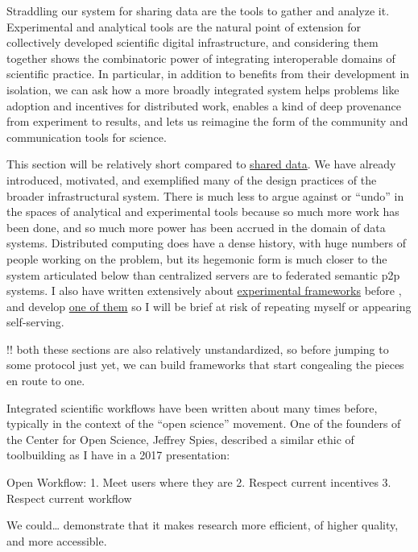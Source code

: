 \documentclass[10pt]{article}
\begin{document}
\begin{multicols}{2}
 Straddling our system for sharing data are the tools to
gather and analyze it. Experimental and analytical tools are the natural
point of extension for collectively developed scientific digital
infrastructure, and considering them together shows the combinatoric
power of integrating interoperable domains of scientific practice. In
particular, in addition to benefits from their development in isolation,
we can ask how a more broadly integrated system helps problems like
adoption and incentives for distributed work, enables a kind of deep
provenance from experiment to results, and lets us reimagine the form of
the community and communication tools for science.

This section will be relatively short compared to
\protect\hyperlink{shared-data}{shared data}. We have already
introduced, motivated, and exemplified many of the design practices of
the broader infrastructural system. There is much less to argue against
or ``undo'' in the spaces of analytical and experimental tools because
so much more work has been done, and so much more power has been accrued
in the domain of data systems. Distributed computing does have a dense
history, with huge numbers of people working on the problem, but its
hegemonic form is much closer to the system articulated below than
centralized servers are to federated semantic p2p systems. I also have
written extensively about
\protect\hyperlink{experimental-frameworks}{experimental frameworks}
before \cite{saundersAutopilotAutomatingBehavioral2019} , and
develop \href{https://docs.auto-pi-lot.com/en/latest/}{one of them} so I
will be brief at risk of repeating myself or appearing self-serving.

!! both these sections are also relatively unstandardized, so before
jumping to some protocol just yet, we can build frameworks that start
congealing the pieces en route to one.

Integrated scientific workflows have been written about many times
before, typically in the context of the ``open science'' movement. One
of the founders of the Center for Open Science, Jeffrey Spies, described
a similar ethic of toolbuilding as I have in a 2017 presentation:

\begin{leftbar}
Open Workflow: 1. Meet users where they are 2. Respect current
incentives 3. Respect current workflow

We could\ldots{} demonstrate that it makes research more efficient, of
higher quality, and more accessible.


\end{leftbar}
\end{multicols}
\end{document}
